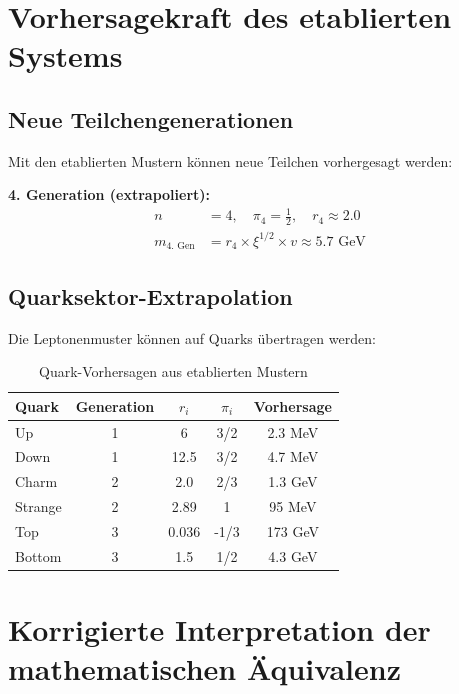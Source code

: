 \section{Vorhersagekraft des etablierten Systems}
\label{sec:predictive_power}

\subsection{Neue Teilchengenerationen}
\label{subsec:new_generations}

Mit den etablierten Mustern können neue Teilchen vorhergesagt werden:

\textbf{4. Generation (extrapoliert):}
\begin{align}
	n &= 4, \quad \pi_4 = \frac{1}{2}, \quad r_4 \approx 2.0 \\
	m_{\text{4. Gen}} &= r_4 \times \xi^{1/2} \times v \approx 5.7 \text{ GeV}
\end{align}

\subsection{Quarksektor-Extrapolation}
\label{subsec:quark_extrapolation}

Die Leptonenmuster können auf Quarks übertragen werden:

\begin{table}[H]
	\centering

	\begin{tabular}{lcccc}
		\toprule
		\textbf{Quark} & \textbf{Generation} & \textbf{$r_i$} & \textbf{$\pi_i$} & \textbf{Vorhersage} \\
		\midrule
		Up & 1 & 6 & 3/2 & 2.3 MeV \\
		Down & 1 & 12.5 & 3/2 & 4.7 MeV \\
		Charm & 2 & 2.0 & 2/3 & 1.3 GeV \\
		Strange & 2 & 2.89 & 1 & 95 MeV \\
		Top & 3 & 0.036 & -1/3 & 173 GeV \\
		Bottom & 3 & 1.5 & 1/2 & 4.3 GeV \\
		\bottomrule
	\end{tabular}

	\caption{Quark-Vorhersagen aus etablierten Mustern}
	\label{tab:quark_predictions}
\end{table}

\section{Korrigierte Interpretation der mathematischen Äquivalenz}
\label{sec:corrected_interpretation}

